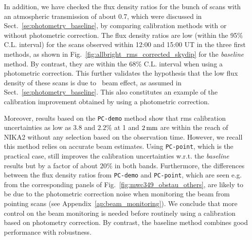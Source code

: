 In addition, we have checked the flux density ratios for the bunch of
scans with an atmospheric transmission of about 0.7, which were
discussed in Sect.~\ref{se:photometry_baseline}, by comparing
calibration methods with or without photometric correction. The
flux density ratios are low (within the 95\% C.L. interval) for the scans
observed within 12:00 and 15:00 UT in the three first methods, as shown in
Fig.~\ref{fig:allbright_rms_corrected_skydip} for
the \emph{baseline} method. By contrast, they are within the 68\% C.L. interval
when using a photometric correction. This further validates the
hypothesis that the low flux
density of these scans is due to \afternoon\ beam effect, as assumed in
Sect.~\ref{se:photometry_baseline}. This also constitutes an example
of the calibration improvement obtained by using a
photometric correction.

Moreover, results based on the {\tt PC-demo} method show that rms
calibration uncertainties as low as $3.8$ and $2.2\%$
at 1 and $2\,\rm{mm}$ are within the reach of NIKA2 {\lp without any
selection based on the observation time.}
However, we recall this method relies on 
accurate beam estimates. Using {\tt PC-point}, which is the
practical case, still improves the calibration uncertainties
w.r.t. the \emph{baseline} results but by a factor of about $20\%$ in both
bands. Furthermore, the differences between
the flux density ratios from {\tt PC-demo} and {\tt PC-point}, which are
seen e.g. from the corresponding panels of
Fig.~\ref{fig:mwc349_obstau_others}, are likely
to be due to the photometric correction noise
when monitoring the beam from pointing scans (see
Appendix~\ref{ap:beam_monitoring}). We conclude that more
control on the beam monitoring is needed before routinely using a calibration
based on photometry correction. By contrast, the baseline method
combines good performance with robustness.



